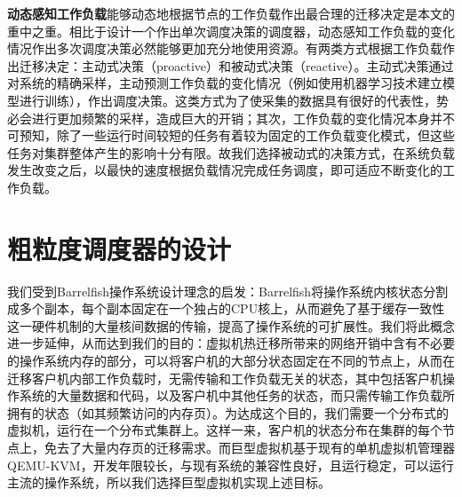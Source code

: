 \noindent\textbf{动态感知工作负载}\quad 能够动态地根据节点的工作负载作出最合理的迁移决定是本文的重中之重。相比于设计一个作出单次调度决策的调度器，动态感知工作负载的变化情况作出多次调度决策必然能够更加充分地使用资源。有两类方式根据工作负载作出迁移决定：主动式决策（proactive）和被动式决策（reactive）。主动式决策通过对系统的精确采样，主动预测工作负载的变化情况（例如使用机器学习技术建立模型进行训练），作出调度决策。这类方式为了使采集的数据具有很好的代表性，势必会进行更加频繁的采样，造成巨大的开销；其次，工作负载的变化情况本身并不可预知，除了一些运行时间较短的任务有着较为固定的工作负载变化模式，但这些任务对集群整体产生的影响十分有限。故我们选择被动式的决策方式，在系统负载发生改变之后，以最快的速度根据负载情况完成任务调度，即可适应不断变化的工作负载。

\section{粗粒度调度器的设计}
我们受到Barrelfish操作系统设计理念的启发：Barrelfish将操作系统内核状态分割成多个副本，每个副本固定在一个独占的CPU核上，从而避免了基于缓存一致性这一硬件机制的大量核间数据的传输，提高了操作系统的可扩展性。我们将此概念进一步延伸，从而达到我们的目的：虚拟机热迁移所带来的网络开销中含有不必要的操作系统内存的部分，可以将客户机的大部分状态固定在不同的节点上，从而在迁移客户机内部工作负载时，无需传输和工作负载无关的状态，其中包括客户机操作系统的大量数据和代码，以及客户机中其他任务的状态，而只需传输工作负载所拥有的状态（如其频繁访问的内存页）。为达成这个目的，我们需要一个分布式的虚拟机，运行在一个分布式集群上。这样一来，客户机的状态分布在集群的每个节点上，免去了大量内存页的迁移需求。而巨型虚拟机基于现有的单机虚拟机管理器QEMU-KVM，开发年限较长，与现有系统的兼容性良好，且运行稳定，可以运行主流的操作系统，所以我们选择巨型虚拟机实现上述目标。
